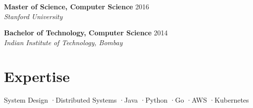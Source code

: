 \documentclass[11pt,letterpaper]{article}
\begin{document}
\noindent\textbf{Master of Science, Computer Science} \hfill 2016\\
\textit{Stanford University}

\vspace{6pt}
\noindent\textbf{Bachelor of Technology, Computer Science} \hfill 2014\\
\textit{Indian Institute of Technology, Bombay}

\section{Expertise}

\begin{center}
{\small System Design \quad\textcolor{darkgold}{·}\quad Distributed Systems \quad\textcolor{darkgold}{·}\quad Java \quad\textcolor{darkgold}{·}\quad Python \quad\textcolor{darkgold}{·}\quad Go \quad\textcolor{darkgold}{·}\quad AWS \quad\textcolor{darkgold}{·}\quad Kubernetes}
\end{center}
\end{document}
